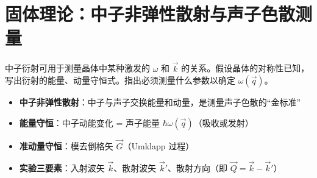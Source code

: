 \section{固体理论：中子非弹性散射与声子色散测量}
\label{sec:neutron-scattering}

\begin{modelbox}[题目：用中子衍射测量声子色散关系]
中子衍射可用于测量晶体中某种激发的 $\omega$ 和 $\vec k$ 的关系。假设晶体的对称性已知，写出衍射的能量、动量守恒式。指出必须测量什么参数以确定 $\omega(\vec q)$。
\end{modelbox}

\begin{tipbox}[考点快速分析]
\begin{itemize}
    \item \textbf{中子非弹性散射}：中子与声子交换能量和动量，是测量声子色散的``金标准''
    \item \textbf{能量守恒}：中子动能变化 = 声子能量 $\hbar\omega(\vec q)$（吸收或发射）
    \item \textbf{准动量守恒}：模去倒格矢 $\vec G$（Umklapp 过程）
    \item \textbf{实验三要素}：入射波矢 $\vec k$、散射波矢 $\vec k'$、散射方向（即 $\vec Q=\vec k-\vec k'$）
\end{itemize}
\end{tipbox}

